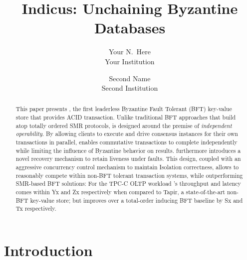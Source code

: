 \documentclass[letterpaper,twocolumn,10pt]{article}
\begin{document}

\date{}

\title{\Large \bf Indicus: Unchaining Byzantine Databases\\
 }

\author{
{\rm Your N.\ Here}\\
Your Institution
\and
{\rm Second Name}\\
Second Institution
} %

\maketitle

\begin{abstract}
This paper presents \sys{}, the first leaderless Byzantine Fault Tolerant (BFT) key-value store that provides ACID transaction. Unlike traditional BFT approaches that build atop totally ordered SMR protocols, \sys is designed around the premise of \textit{independent operability}. By allowing clients to execute and drive consensus instances for their own transactions in parallel, \sys enables commutative transactions to complete independently while limiting the influence of Byzantine behavior on results. \sys furthermore introduces a novel recovery mechanism to retain liveness under faults.
This design, coupled with an aggressive concurrency control mechanism to maintain Isolation correctness, allows \sys to reasonably compete within non-BFT tolerant transaction systems, while outperforming SMR-based BFT solutions: For the TPC-C OLTP workload \sys{}'s throughput and latency comes within Yx and Zx respectively when compared to Tapir, a state-of-the-art non-BFT key-value store; but improves over a total-order inducing BFT baseline by Sx and Tx respectively.
\end{abstract}


\section{Introduction} 
\end{document}
